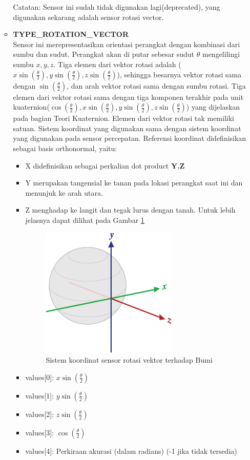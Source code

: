 \documentclass[a4paper,twoside]{article}
\begin{document}
\begin{enumerate}
\begin{itemize}
Catatan: Sensor ini sudah tidak digunakan lagi(deprecated), yang digunakan sekarang adalah sensor rotasi vector.\\
\item \textbf{TYPE\_ROTATION\_VECTOR}\\
Sensor ini merepresentasikan orientasi perangkat dengan kombinasi dari sumbu dan sudut. Perangkat akan di putar sebesar sudut \(\theta\) mengelilingi sumbu \(x,y,z\). Tiga elemen dari vektor rotasi adalah (\(x \sin (\frac{\theta}{2}), y \sin (\frac{\theta}{2}), z \sin (\frac{\theta}{2})\)), sehingga besarnya vektor rotasi sama dengan \(\sin (\frac{\theta}{2})\), dan arah vektor rotasi sama dengan sumbu rotasi. Tiga elemen dari vektor rotasi sama dengan tiga komponen terakhir pada unit kuaternion(\(\cos (\frac{\theta}{2}),x \sin (\frac{\theta}{2}), y \sin (\frac{\theta}{2}), z \sin (\frac{\theta}{2})\)) yang dijelaskan pada bagian Teori Kuaternion. Elemen dari vektor rotasi tak memiliki satuan. Sistem koordinat yang digunakan sama dengan sistem koordinat yang digunakan pada sensor percepatan. Referensi koordinat didefinisikan sebagai basis orthonormal, yaitu:
\begin{itemize}
	\item X didefinisikan sebagai perkalian dot product \textbf{Y.Z}
	\item Y merupakan tangensial ke tanan pada lokasi perangkat saat ini dan menunjuk ke arah utara. 
	\item Z menghadap ke langit dan tegak lurus dengan tanah. Untuk lebih jelasnya dapat dilihat pada Gambar \ref{fig:axis-globe}
	\begin{figure}[htbp]
	\centering
	\includegraphics[scale=1]{Gambar/axis-globe.png}
	\caption{Sistem koordinat sensor rotasi vektor terhadap Bumi} 
	\label{fig:axis-globe}
	\end{figure}
	\item values[0]: \(x \sin (\frac{\theta}{2})\)
	\item values[1]: \(y \sin (\frac{\theta}{2})\)
	\item values[2]: \(z \sin (\frac{\theta}{2})\)
	\item values[3]: \(\cos (\frac{\theta}{2})\)
	\item values[4]: Perkiraan akurasi (dalam radians) (-1 jika tidak tersedia) 
\end{itemize}


\end{itemize}
\end{enumerate}
\end{document}
